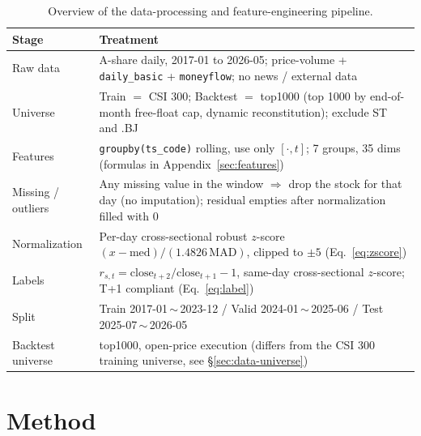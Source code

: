 \documentclass[a4paper,11pt]{article}
\begin{document}
\begin{table}[H]
\centering
\caption{Overview of the data-processing and feature-engineering pipeline.}
\label{tab:pipeline}
\begin{tabularx}{\linewidth}{l>{\raggedright\arraybackslash}X}
\toprule
Stage & Treatment \\
\midrule
Raw data   & A-share daily, 2017-01 to 2026-05; price-volume + \texttt{daily\_basic} + \texttt{moneyflow}; no news / external data \\
Universe   & Train $=$ CSI 300; Backtest $=$ top1000 (top 1000 by end-of-month free-float cap, dynamic reconstitution); exclude ST and .BJ \\
Features   & \texttt{groupby(ts\_code)} rolling, use only $[\cdot,t]$; 7 groups, 35 dims (formulas in Appendix~\ref{sec:features}) \\
Missing / outliers & Any missing value in the window $\Rightarrow$ drop the stock for that day (no imputation); residual empties after normalization filled with $0$ \\
Normalization & Per-day cross-sectional robust $z$-score $(x{-}\mathrm{med})/(1.4826\,\mathrm{MAD})$, clipped to $\pm5$ (Eq.~\ref{eq:zscore}) \\
Labels     & $r_{s,t}{=}\mathrm{close}_{t+2}/\mathrm{close}_{t+1}{-}1$, same-day cross-sectional $z$-score; T+1 compliant (Eq.~\ref{eq:label}) \\
Split      & Train 2017-01\,$\sim$\,2023-12 / Valid 2024-01\,$\sim$\,2025-06 / Test 2025-07\,$\sim$\,2026-05 \\
Backtest universe & top1000, open-price execution (differs from the CSI 300 training universe, see \S\ref{sec:data-universe}) \\
\bottomrule
\end{tabularx}
\end{table}

\section{Method}\label{sec:method}
\end{document}
